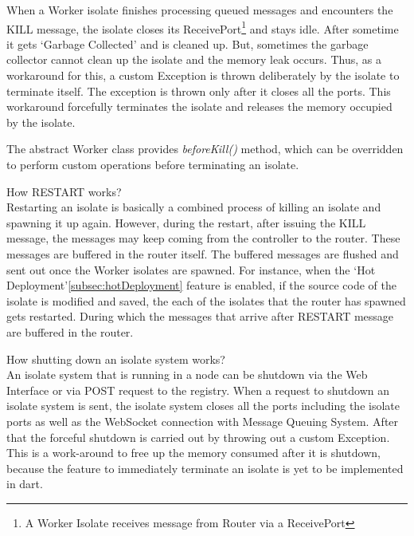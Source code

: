 \begin{description}
    When a Worker isolate finishes processing queued messages and encounters the KILL message, the isolate closes its ReceivePort\footnote{A Worker Isolate receives message from Router via a ReceivePort} and stays idle. After sometime it gets ‘Garbage Collected’ and is cleaned up. But, sometimes the garbage collector cannot clean up the isolate and the memory leak occurs. Thus, as a workaround for this, a custom Exception is thrown deliberately by the isolate to terminate itself. The exception is thrown only after it closes all the ports. This workaround forcefully terminates the isolate and releases the memory occupied by the isolate.

    The abstract Worker class provides \emph{beforeKill()} method, which can be overridden to perform custom operations before terminating an isolate.

    \item How RESTART works?\\
    Restarting an isolate is basically a combined process of killing an isolate and spawning it up again. However, during the restart, after issuing the KILL message, the messages may keep coming from the controller to the router. These messages are buffered in the router itself. The buffered messages are flushed and sent out once the Worker isolates are spawned. For instance, when the ‘Hot Deployment’\autoref{subsec:hotDeployment} feature is enabled, if the source code of the isolate is modified and saved, the each of the isolates that the router has spawned gets restarted. During which the messages that arrive after RESTART message are buffered in the router.

    \item How shutting down an isolate system works?\\
    An isolate system that is running in a node can be shutdown via the Web Interface or via POST request to the registry. When a request to shutdown an isolate system is sent, the isolate system closes all the ports including the isolate ports as well as the WebSocket connection with Message Queuing System. After that the forceful shutdown is carried out by throwing out a custom Exception. This is a work-around to free up the memory consumed after it is shutdown, because the feature to immediately terminate an isolate is yet to be implemented in dart.
  \end{description}

